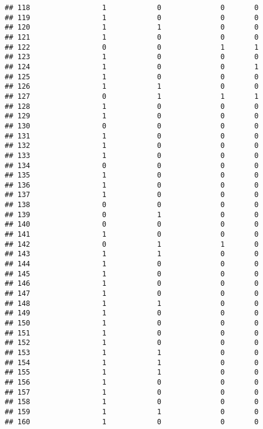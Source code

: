 \documentclass[]{article}
\begin{document}
\begin{verbatim}
## 118                 1            0              0       0
## 119                 1            0              0       0
## 120                 1            1              0       0
## 121                 1            0              0       0
## 122                 0            0              1       1
## 123                 1            0              0       0
## 124                 1            0              0       1
## 125                 1            0              0       0
## 126                 1            1              0       0
## 127                 0            1              1       1
## 128                 1            0              0       0
## 129                 1            0              0       0
## 130                 0            0              0       0
## 131                 1            0              0       0
## 132                 1            0              0       0
## 133                 1            0              0       0
## 134                 0            0              0       0
## 135                 1            0              0       0
## 136                 1            0              0       0
## 137                 1            0              0       0
## 138                 0            0              0       0
## 139                 0            1              0       0
## 140                 0            0              0       0
## 141                 1            0              0       0
## 142                 0            1              1       0
## 143                 1            1              0       0
## 144                 1            0              0       0
## 145                 1            0              0       0
## 146                 1            0              0       0
## 147                 1            0              0       0
## 148                 1            1              0       0
## 149                 1            0              0       0
## 150                 1            0              0       0
## 151                 1            0              0       0
## 152                 1            0              0       0
## 153                 1            1              0       0
## 154                 1            1              0       0
## 155                 1            1              0       0
## 156                 1            0              0       0
## 157                 1            0              0       0
## 158                 1            0              0       0
## 159                 1            1              0       0
## 160                 1            0              0       0

\end{verbatim}
\end{document}

